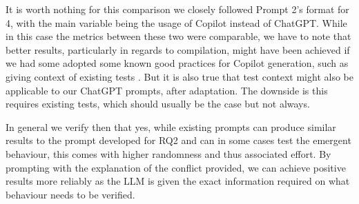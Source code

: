 It is worth nothing for this comparison we closely followed Prompt 2's format for 4, with the main variable being the usage of Copilot
instead of ChatGPT. While in this case the metrics between these two were comparable, we have to note that better results, particularly 
in regards to compilation, might have been achieved if we had some adopted some known good practices for Copilot generation, such as giving
context of existing tests \citet{kn:githubcopilot}. But it is also true that test context might also be applicable to our ChatGPT prompts,
after adaptation. The downside is this requires existing tests, which should usually be the case but not always.

In general we verify then that yes, while existing prompts can produce similar results to the prompt developed for RQ2
and can in some cases test the emergent behaviour, this comes with higher randomness and thus associated effort.
By prompting with the explanation of the conflict provided, we can achieve positive results more reliably as the
LLM is given the exact information required on what behaviour needs to be verified.

